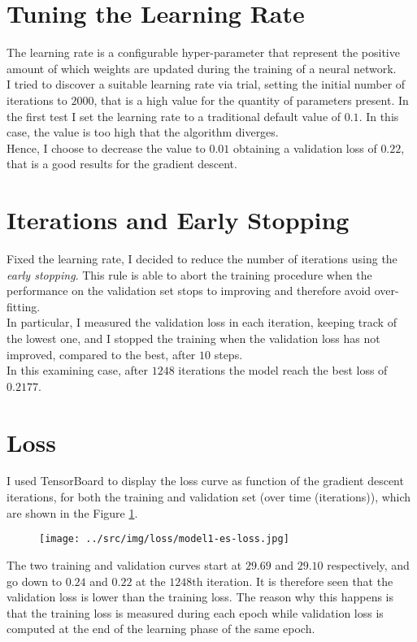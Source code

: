 \documentclass[a4paper,12pt]{article} %
\begin{document}
	\section{Tuning the Learning Rate}
	The learning rate is a configurable hyper-parameter that represent the positive amount of which weights are updated during the training of a neural network.\\
	I tried to discover a suitable learning rate via trial, setting the initial 
	number of iterations to $2000$, that is a high value for the quantity of 
	parameters present.
	In the first test I set the learning rate to a traditional default value of $0.1$. In this case, the value is too high that the algorithm diverges.\\
	Hence, I choose to decrease the value to $0.01$ obtaining a validation loss of $0.22$, that is a good results for the gradient descent.
	
	\section{Iterations and Early Stopping}
	Fixed the learning rate, I decided to reduce the number of iterations using 
	the \textit{early stopping}. This rule is able to abort the training 
	procedure when the performance on the validation set stops to improving and 
	therefore avoid over-fitting. \\
	In particular, I measured the validation loss in each iteration, keeping track of the lowest one, and I stopped the training when the validation loss has not improved, compared to the best, after $10$ steps.\\
	In this examining case, after $1248$ iterations the model reach the best loss of $0.2177$.
	
	\section{Loss}
	I used {TensorBoard} to display the loss curve as function of the gradient 
	descent iterations, for both the training and validation set (over time 
	(iterations)), which are shown in the Figure \ref{fig:model1-loss}.
	
	\begin{figure}[h]
		\centering
		\texttt{[image: ../src/img/loss/model1-es-loss.jpg]}
		\label{fig:model1-loss}
	\end{figure}
	
	The two training and validation curves start at $29.69$ and $29.10$ respectively, and go down to $0.24$ and $0.22$ at the $1248\mathrm{th}$ iteration.
	It is therefore seen that the validation loss is lower than the training loss. The reason why this happens is that the training loss is measured during each epoch while validation loss is computed at the end of the learning phase of the same epoch.
	
\end{document}
